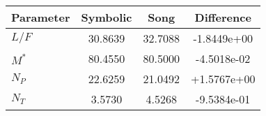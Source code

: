 \begin{tabular}{|l||c|c|c|}
\hline
\bf{Parameter} & \bf{Symbolic} & \bf{Song} & \bf{Difference} \\
\hline
$L/F$ & 30.8639 & 32.7088 & -1.8449e+00 \\
\hline
$M^*$ & 80.4550 & 80.5000 & -4.5018e-02 \\
\hline
$N_P$ & 22.6259 & 21.0492 & +1.5767e+00 \\
\hline
$N_T$ & 3.5730 & 4.5268 & -9.5384e-01 \\
\hline
\end{tabular}
